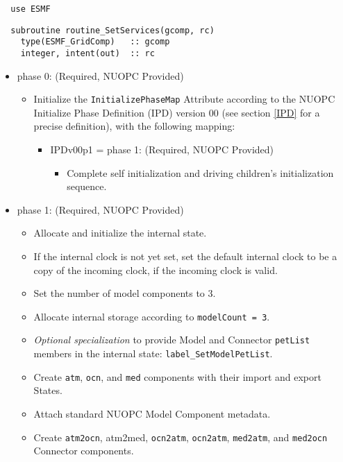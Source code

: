 \begin{verbatim}  use ESMF
\end{verbatim}

\begin{verbatim}  subroutine routine_SetServices(gcomp, rc)
    type(ESMF_GridComp)   :: gcomp
    integer, intent(out)  :: rc
\end{verbatim}

\begin{itemize}
\item phase 0: ({\sc Required, NUOPC Provided})
  \begin{itemize}
  \item Initialize the {\tt InitializePhaseMap} Attribute according to the NUOPC Initialize Phase Definition (IPD) version 00 (see section \ref{IPD} for a precise definition), with the following mapping:
    \begin{itemize}
    \item IPDv00p1 = phase 1: ({\sc Required, NUOPC Provided})
      \begin{itemize}
      \item Complete self initialization and driving children's initialization sequence.
      \end{itemize}
    \end{itemize}  
  \end{itemize}  
\item phase 1: ({\sc Required, NUOPC Provided})
  \begin{itemize}
  \item Allocate and initialize the internal state.
  \item If the internal clock is not yet set, set the default internal clock to be a copy of the incoming clock, if the incoming clock is valid.
  \item Set the number of model components to 3.
  \item Allocate internal storage according to {\tt modelCount = 3}.
  \item {\it Optional specialization} to provide Model and Connector {\tt petList} members in the internal state: {\tt label\_SetModelPetList}.
  \item Create {\tt atm}, {\tt ocn}, and {\tt med} components with their import and export States.
  \item Attach standard NUOPC Model Component metadata.
  \item Create {\tt atm2ocn}, {atm2med}, {\tt ocn2atm}, {\tt ocn2atm}, {\tt med2atm}, and {\tt med2ocn} Connector components.

\end{itemize}
\end{itemize}
